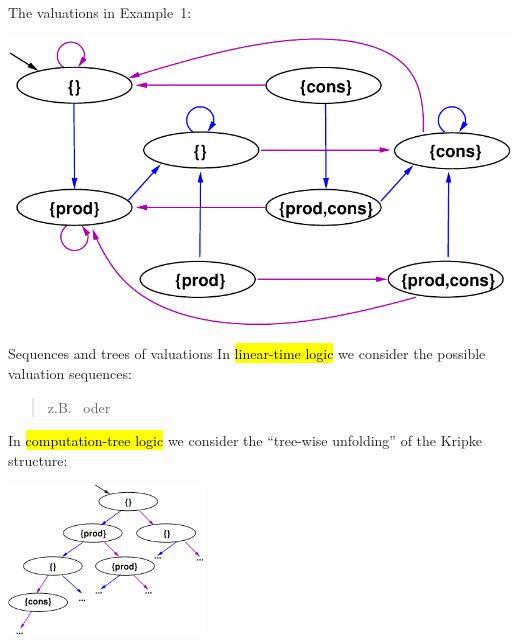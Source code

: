 
\begin{frame}{}
The valuations in Example~1:

\bigskip
\begin{center}
\includegraphics[width=\textwidth]{content/chapter_model_checking/model_checking/images/mutex-krip}
\end{center}

\end{frame}


\begin{frame}{Sequences and trees of valuations}
In \hl{linear-time logic} we consider the possible valuation sequences:

\begin{quote}
z.B.\ \quad {}
\quad oder \quad
{}
\end{quote}

\bigskip
In \hl{computation-tree logic} we consider the ``tree-wise unfolding''
   of the Kripke structure:
\begin{center}
\includegraphics[height=4cm]{content/chapter_model_checking/model_checking/images/mutex-tree}
\end{center}   
\end{frame}

